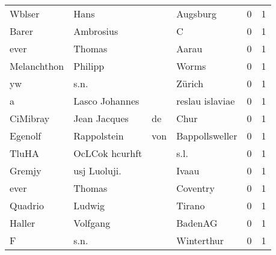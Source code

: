 \begin{center}
\begin{tiny}
\begin{longtabu}{llllrr}
                   Wblser &                               Hans &             &                                    Augsburg &          0 &         1 \\
                    Barer &                          Ambrosius &             &                                           C &          0 &         1 \\
                     ever &                             Thomas &             &                                       Aarau &          0 &         1 \\
              Melanchthon &                            Philipp &             &                                       Worms &          0 &         1 \\
                       yw &                               s.n. &             &                                      Zürich &          0 &         1 \\
                        a &                     Lasco Johannes &             &                             reslau islaviae &          0 &         1 \\
                 CiMibray &                       Jean Jacques &          de &                                        Chur &          0 &         1 \\
                  Egenolf &                        Rappolstein &         von &                              Bappollsweller &          0 &         1 \\
                    TluHA &                     OcLCok hcurhft &             &                                        s.l. &          0 &         1 \\
                   Gremjy &                       usj Luoluji. &             &                                       Ivaau &          0 &         1 \\
                     ever &                             Thomas &             &                                    Coventry &          0 &         1 \\
                  Quadrio &                             Ludwig &             &                                      Tirano &          0 &         1 \\
                   Haller &                           Volfgang &             &                                     BadenAG &          0 &         1 \\
                        F &                               s.n. &             &                                  Winterthur &          0 &         1 \\

\end{longtabu}
\end{tiny}
\end{center}
